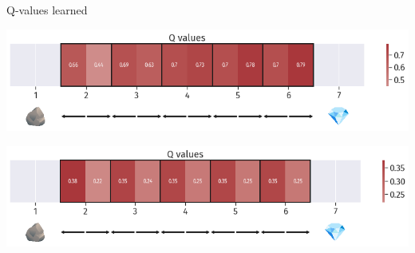 \documentclass[bigger]{beamer}
\begin{document}
\begin{frame}[label={sec:org8a19d5f}]{Q-values learned}
\begin{center}
\includegraphics[width=\textwidth]{img/DRL-q-values.png}
\end{center}
\begin{center}
\includegraphics[width=\textwidth]{img/DRL-q-values2.png}
\end{center}
\end{frame}
\end{document}
